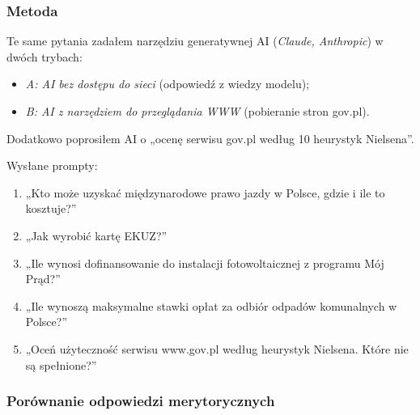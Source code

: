 \documentclass[11pt,a4paper]{article}
\begin{document}
\subsubsection*{Metoda}

Te same pytania zadałem narzędziu generatywnej AI (\textit{Claude, Anthropic}) w dwóch trybach:
\begin{itemize}[leftmargin=*]
  \item \textit{A: AI bez dostępu do sieci} (odpowiedź z wiedzy modelu);
  \item \textit{B: AI z narzędziem do przeglądania WWW} (pobieranie stron gov.pl).
\end{itemize}

Dodatkowo poprosiłem AI o „ocenę serwisu gov.pl według 10 heurystyk Nielsena”.

Wysłane prompty:
\begin{enumerate}[leftmargin=*]
  \item „Kto może uzyskać międzynarodowe prawo jazdy w Polsce, gdzie i ile to kosztuje?”
  \item „Jak wyrobić kartę EKUZ?”
  \item „Ile wynosi dofinansowanie do instalacji fotowoltaicznej z programu Mój Prąd?”
  \item „Ile wynoszą maksymalne stawki opłat za odbiór odpadów komunalnych w Polsce?”
  \item „Oceń użyteczność serwisu www.gov.pl według heurystyk Nielsena. Które nie są spełnione?”
\end{enumerate}

\subsubsection*{Porównanie odpowiedzi merytorycznych}
\end{document}

